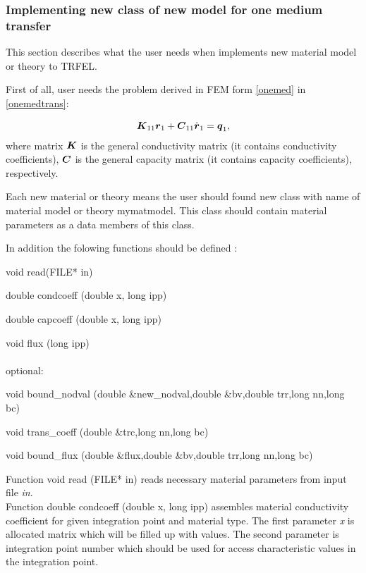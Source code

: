 \subsubsection {Implementing new class of new model for one medium transfer}
This section describes what the user needs when implements new material model or theory
to TRFEL. 

First of all, user needs the problem derived in FEM form \eqref{onemed} in \ref{onemedtrans}:

\begin{eqnarray}
\mbox{\boldmath$K$}_{11}\mbox{\boldmath$r$}_1 + \mbox{\boldmath$C$}_{11}\dot{\mbox{\boldmath$r$}}_1 = {\mbox{\boldmath$q$}}_1,\nonumber
\end{eqnarray}
where matrix $\mbox{\boldmath$K$}$ is the general conductivity matrix (it contains conductivity coefficients), 
$\mbox{\boldmath$C$}$ is the general capacity matrix (it contains capacity coefficients), respectively.

Each new material or theory means the user should found new class with name of material model or theory {\sf mymatmodel}.
This class should contain material parameters as a data members of this class. 

In addition the folowing functions should be defined :

\begin{itemize}
{\sf
\item
void read(FILE* in)
\item
double condcoeff (double x, long ipp)
\item
double capcoeff (double x, long ipp)
\item
void flux (long ipp)\\\\
{\rm optional:}
\item 
{void bound\_nodval (double \&new\_nodval,double \&bv,double trr,long nn,long bc)}
\item 
{void trans\_coeff (double \&trc,long nn,long bc)}
\item 
{void bound\_flux (double \&flux,double \&bv,double trr,long nn,long bc)}
}
\end{itemize}

Function {\sf void read (FILE* in)} reads necessary material parameters from input file {\it in}.\\

Function {\sf double condcoeff (double x, long ipp)} assembles material conductivity coefficient for given
integration point and material type. The first parameter {\it x} is allocated matrix which will be
filled up with values. The second parameter is integration point number which should be used for
access characteristic values in the integration point.\\

